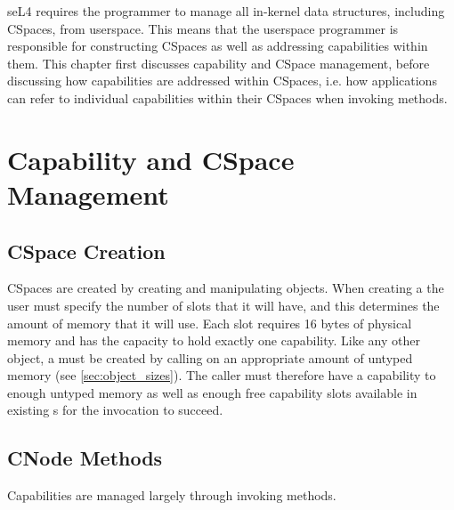 seL4 requires the programmer to manage all in-kernel data structures,
including CSpaces, from userspace. This means that the userspace
programmer is responsible for constructing CSpaces as well as
addressing capabilities within them.  This chapter first discusses
capability and CSpace management, before discussing how capabilities
are addressed within CSpaces, i.e. how applications can refer to
individual capabilities within their CSpaces when invoking methods.

\section{Capability and CSpace Management}

\subsection{CSpace Creation}

CSpaces are created by creating and manipulating  objects.
When creating a  the user must specify the number of slots
that it will have, and this determines the amount of memory that it
will use. Each slot requires 16 bytes of physical memory and has the
capacity to hold exactly one capability. Like any other object, a
 must be created by calling
 on an appropriate
amount of untyped memory (see \autoref{sec:object_sizes}).  The caller
must therefore have a capability to enough untyped memory as well as
enough free capability slots available in existing s for
the  invocation to
succeed.

\subsection{CNode Methods}
\label{sec:cnode-ops}

Capabilities are managed largely through invoking  methods.

